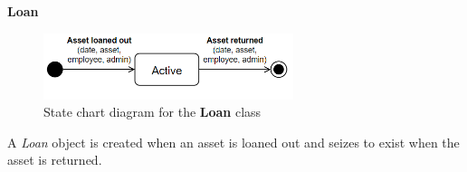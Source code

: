 
\large{\textbf{Loan}}
\begin{figure}[H]
    \centering
    \includegraphics[width=0.65\textwidth]{figures/StateCharts/Loan_state_chart.png}
    \caption{State chart diagram for the \textbf{Loan} class}
    \label{fig:loan_statechart}
\end{figure}

A \textit{Loan} object is created when an asset is loaned out and seizes to exist when the asset is returned.